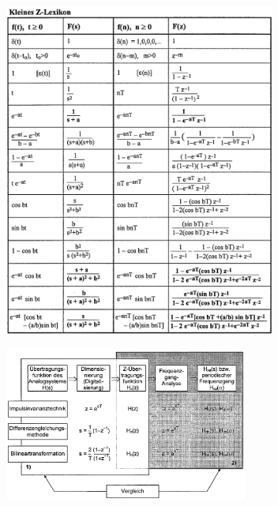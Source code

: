 \begin{minipage}{11cm}
	\includegraphics[height=11cm]{bilder/Z-Lexikon.png}
\end{minipage}
\begin{minipage}{8cm}
	\includegraphics[width=8cm]{bilder/IIR-ArbeitsschritteundVarianten.png}
\end{minipage}

